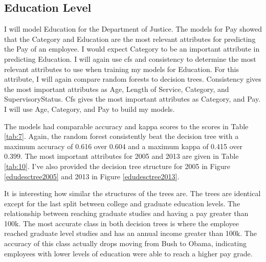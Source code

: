 \documentclass{article}
\begin{document}
    \subsection{Education Level}
    I will model Education for the Department of Justice. The models for Pay showed that the Category and Education are the most relevant attributes for predicting the Pay of an employee. I would expect Category to be an important attribute in predicting Education. I will again use cfs and consistency to determine the most relevant attributes to use when training my models for Education. For this attribute, I will again compare random forests to decision trees. Consistency gives the most important attributes as Age, Length of Service, Category, and SupervisoryStatus. Cfs gives the most important attributes as Category, and Pay. I will use Age, Category, and Pay to build my models.
    \par
    The models had comparable accuracy and kappa scores to the scores in Table \ref{tab:7}. Again, the random forest consistently beat the decision tree with a maximum accuracy of 0.616 over 0.604 and a maximum kappa of 0.415 over 0.399. The most important attributes for 2005 and 2013 are given in Table \ref{tab:10}. I've also provided the decision tree structure for 2005 in Figure \ref{edudesctree2005} and 2013 in Figure \ref{edudesctree2013}.
    \par
    It is interesting how similar the structures of the trees are. The trees are identical except for the last split between college and graduate education levels. The relationship between reaching graduate studies and having a pay greater than 100k. The most accurate class in both decision trees is where the employee reached graduate level studies and has an annual income greater than 100k. The accuracy of this class actually drops moving from Bush to Obama, indicating employees with lower levels of education were able to reach a higher pay grade.
\end{document}
